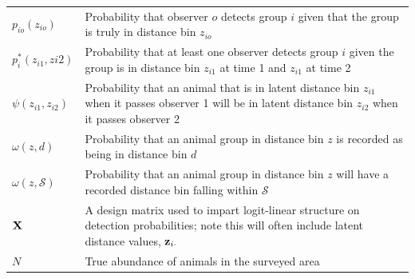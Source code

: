 \documentclass[12pt,fleqn]{article}
\begin{document}
\begin{table}[ht]
\begin{tabular}{p{2cm}p{13cm}}
  $p_{io}(z_{io})$ & Probability that observer $o$ detects group $i$ given that the group is truly in distance bin $z_{io}$\\
  $p_i^*(z_{i1},z{i2})$ & Probability that at least one observer detects group $i$ given the group is in distance bin $z_{i1}$ at time 1 and $z_{i1}$ at time 2\\
  $\psi(z_{i1},z_{i2})$ & Probability that an animal that is in latent distance bin $z_{i1}$ when it passes observer 1 will be in latent distance bin $z_{i2}$ when it passes observer 2 \\
  $\omega(z,d)$ & Probability that an animal group in distance bin $z$ is recorded as being in distance bin $d$ \\
  $\omega(z,\mathcal{S})$ & Probability that an animal group in distance bin $z$ will have a recorded distance bin falling within $\mathcal{S}$ \\
  ${\bf X}$ & A design matrix used to impart logit-linear structure on detection probabilities; note this will often include latent distance values, ${\bf z}_{i \cdot}$  \\
  $N$ & True abundance of animals in the surveyed area \\
\hline
\end{tabular}
\\
\end{table}


\end{document}
